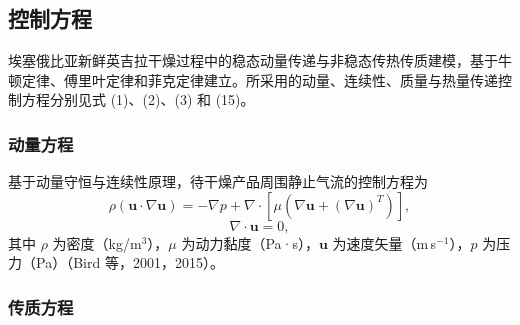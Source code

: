 \documentclass[11pt,a4paper]{ctexart}
\begin{document}
\subsection{控制方程}

埃塞俄比亚新鲜英吉拉干燥过程中的稳态动量传递与非稳态传热传质建模，基于牛顿定律、傅里叶定律和菲克定律建立。所采用的动量、连续性、质量与热量传递控制方程分别见式 (1)、(2)、(3) 和 (15)。

\subsubsection{动量方程}

基于动量守恒与连续性原理，待干燥产品周围静止气流的控制方程为
\begin{equation}
\rho(\bm{u}\cdot\nabla \bm{u}) = -\nabla p + \nabla\cdot\left[\mu\left(\nabla \bm{u} + (\nabla \bm{u})^{T}\right)\right],
\end{equation}
\begin{equation}
\nabla\cdot \bm{u} = 0,
\end{equation}
其中 $\rho$ 为密度（kg/m$^3$），$\mu$ 为动力黏度（Pa·s），$\bm{u}$ 为速度矢量（m\,s$^{-1}$），$p$ 为压力（Pa）（Bird 等，2001，2015）。

\subsubsection{传质方程}
\end{document}
